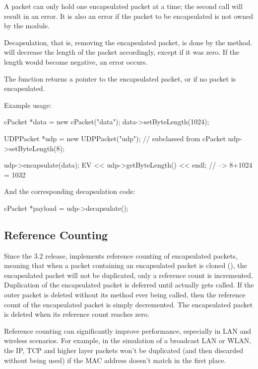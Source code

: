 A packet can only hold one encapsulated packet at a time; the second
 call will result in an error. It is also an error if
the packet to be encapsulated is not owned by the module.

Decapsulation, that is, removing the encapsulated packet, is done by the
 method.  will decrease the
length of the packet accordingly, except if it was zero. If the length
would become negative, an error occurs.

The  function returns a pointer to the
encapsulated packet, or  if no packet is encapsulated.

Example usage:

\begin{cpp}
cPacket *data = new cPacket("data");
data->setByteLength(1024);

UDPPacket *udp = new UDPPacket("udp"); // subclassed from cPacket
udp->setByteLength(8);

udp->encapsulate(data);
EV << udp->getByteLength() << endl; // --> 8+1024 = 1032
\end{cpp}

And the corresponding decapsulation code:

\begin{cpp}
cPacket *payload = udp->decapsulate();
\end{cpp}



\subsection{Reference Counting}
\label{sec:messages:reference-counting}

Since the 3.2 release, {\opp} implements reference counting of encapsulated
packets, meaning that when a packet containing an encapsulated packet is
cloned (), the encapsulated packet will not be duplicated,
only a reference count is incremented. Duplication of
the encapsulated packet is deferred until 
actually gets called. If the outer packet is deleted without its
 method ever being called, then the reference
count of the encapsulated packet is simply decremented. The
encapsulated packet is deleted when its reference count reaches
zero.

Reference counting can significantly improve performance, especially
in LAN and wireless scenarios. For example, in the simulation of a
broadcast LAN or WLAN, the IP, TCP and higher layer packets won't
be duplicated (and then discarded without being used) if the
MAC address doesn't match in the first place.

